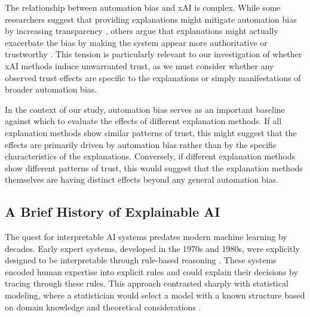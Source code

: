The relationship between automation bias and xAI is complex. While some researchers suggest that providing explanations might mitigate automation bias by increasing transparency \cite{wang_effects_2016}, others argue that explanations might actually exacerbate the bias by making the system appear more authoritative or trustworthy \cite{lyons_automation_2018}. This tension is particularly relevant to our investigation of whether xAI methods induce unwarranted trust, as we must consider whether any observed trust effects are specific to the explanations or simply manifestations of broader automation bias.

In the context of our study, automation bias serves as an important baseline against which to evaluate the effects of different explanation methods. If all explanation methods show similar patterns of trust, this might suggest that the effects are primarily driven by automation bias rather than by the specific characteristics of the explanations. Conversely, if different explanation methods show different patterns of trust, this would suggest that the explanation methods themselves are having distinct effects beyond any general automation bias.

\subsection{A Brief History of Explainable AI}\label{ssec:history}

The quest for interpretable AI systems predates modern machine learning by decades. Early expert systems, developed in the 1970s and 1980s, were explicitly designed to be interpretable through rule-based reasoning \cite{shortliffe_mycin_1976}. These systems encoded human expertise into explicit rules and could explain their decisions by tracing through these rules. This approach contrasted sharply with statistical modeling, where a statistician would select a model with a known structure based on domain knowledge and theoretical considerations \cite{breiman_statistical_2001}.

